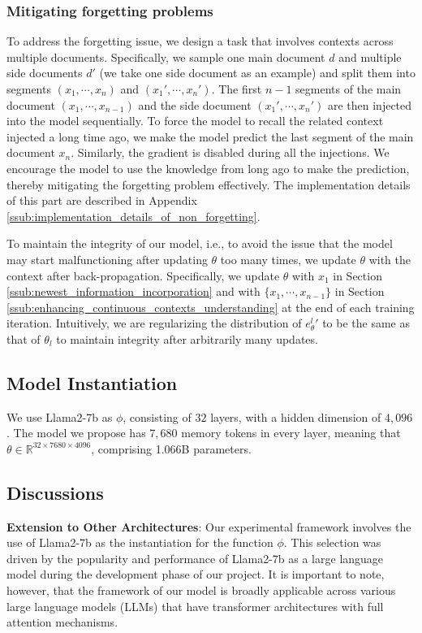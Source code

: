 \documentclass{article}
\theoremstyle{plain}
\theoremstyle{definition}
\theoremstyle{remark}
\begin{document}
\subsubsection{Mitigating forgetting problems} 
\label{ssub:mitigating_forgetting_problems}
To address the forgetting issue, we design a task that involves contexts across multiple documents. Specifically, we sample one main document $d$ and multiple side documents $d'$ (we take one side document as an example) and split them into segments $(x_1, \cdots, x_n)$ and $(x_1',\cdots, x_n')$. The first $n-1$ segments of the main document $(x_1, \cdots, x_{n-1})$ and the side document $(x_1',\cdots,x_{n}')$ are then injected into the model sequentially. To force the model to recall the related context injected a long time ago, we make the model predict the last segment of the main document ${x_n}$. Similarly, the gradient is disabled during all the injections. We encourage the model to use the knowledge from long ago to make the prediction, thereby mitigating the forgetting problem effectively. The implementation details of this part are described in Appendix \ref{ssub:implementation_details_of_non_forgetting}.

To maintain the integrity of our model, i.e., to avoid the issue that the model may start malfunctioning after updating $\theta$ too many times, we update $\theta$ with the context after back-propagation. Specifically, we update $\theta$ with $x_1$ in Section \ref{ssub:newest_information_incorporation} and with $\{x_1,\cdots,x_{n-1}\}$ in Section \ref{ssub:enhancing_continuous_contexts_understanding} at the end of each training iteration. Intuitively, we are regularizing the distribution of ${e_\theta^l}'$ to be the same as that of $\theta_l$ to maintain integrity after arbitrarily many updates.

\vspace{-5pt}
\subsection{Model Instantiation}
We use Llama2-7b as $\phi$, consisting of $32$ layers, with a hidden dimension of $4,096$. The model we propose has $7,680$ memory tokens in every layer, meaning that $\theta \in \mathbb{R}^{32 \times 7680 \times 4096}$, comprising 1.066B parameters. 

\vspace{-5pt}
\subsection{Discussions}
\textbf{Extension to Other Architectures}: Our experimental framework involves the use of Llama2-7b as the instantiation for the function $\phi$. This selection was driven by the popularity and performance of Llama2-7b as a large language model during the development phase of our project. It is important to note, however, that the framework of our model is broadly applicable across various large language models (LLMs) that have transformer architectures with full attention mechanisms. 
\end{document}
